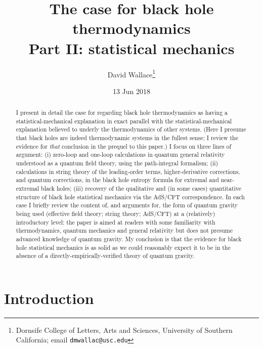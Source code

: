 \documentclass[12pt]{article}
\date{13 Jun 2018}
\begin{document}
\title{The case for black hole thermodynamics \\  Part II: statistical mechanics}
\author{David Wallace\thanks{Dornsife College of Letters, Arts and Sciences, University of Southern California; email \texttt{dmwallac@usc.edu}}}
\maketitle

\begin{abstract}
I present in detail the case for regarding black hole thermodynamics as having a statistical-mechanical explanation in exact parallel with the statistical-mechanical explanation believed to underly the thermodynamics of other systems. (Here I presume that black holes are indeed thermodynamic systems in the fullest sense; I review the evidence for \emph{that} conclusion in the prequel to this paper.) I focus on three lines of argument: (i) zero-loop and one-loop calculations in quantum general relativity understood as a quantum field theory, using the path-integral formalism; (ii) calculations in string theory of the leading-order terms, higher-derivative corrections, and quantum corrections, in the black hole entropy formula for extremal and near-extremal black holes; (iii) recovery of the qualitative and (in some cases) quantitative structure of black hole statistical mechanics via the AdS/CFT correspondence. In each case I briefly review the content of, and arguments for, the form of quantum gravity being used (effective field theory; string theory; AdS/CFT) at a (relatively) introductory level: the paper is aimed at readers with some familiarity with thermodynamics, quantum mechanics and general relativity but does not presume advanced knowledge of quantum gravity. My conclusion is that the evidence for black hole statistical mechanics is as solid as we could reasonably expect it to be in the absence of a directly-empirically-verified theory of quantum gravity.
\end{abstract}



\section{Introduction}\label{introduction}
\end{document}
